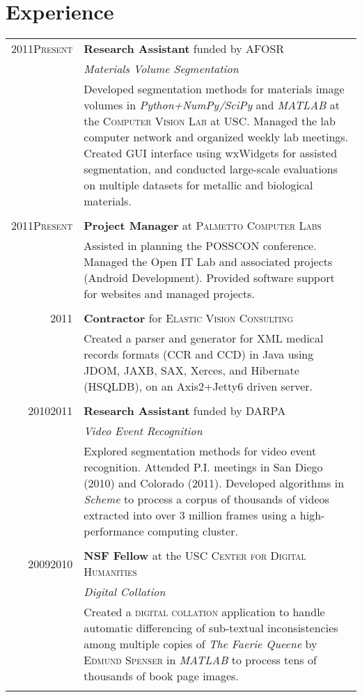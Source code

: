 \documentclass[a4paper,10pt]{article}
\begin{document}
\section{Experience}
\begin{longtable}{r|p{12cm}}
  \textsc{2011\textemdash{}Present}
  & \textbf{Research Assistant} funded by \textsc{AFOSR} \\
  &\emph{Materials Volume Segmentation}\\
  &\footnotesize{Developed segmentation methods for materials image
    volumes in \emph{Python+NumPy/SciPy} and \emph{MATLAB} at the
    \textsc{Computer Vision Lab} at \textsc{USC}. Managed the lab
    computer network and organized weekly lab meetings.  Created GUI
    interface using wxWidgets for assisted segmentation, and conducted
    large-scale evaluations on multiple datasets for metallic and
    biological materials.}
  \\\multicolumn{2}{c}{} \\
  \textsc{2011\textemdash{}Present}
  & \textbf{Project Manager} at \textsc{Palmetto Computer Labs}\\
  &\footnotesize{Assisted in planning the POSSCON conference. Managed
    the Open IT Lab and associated projects (Android
    Development). Provided software support for websites and managed
    projects.}
  \\\multicolumn{2}{c}{} \\
  \textsc{2011}
  & \textbf{Contractor} for \textsc{Elastic Vision Consulting} \\
  &\footnotesize{Created a parser and generator for XML medical
    records formats (CCR and CCD) in Java using JDOM, JAXB, SAX,
    Xerces, and Hibernate (HSQLDB), on an Axis2+Jetty6 driven server.}
  \\\multicolumn{2}{c}{} \\
  \textsc{2010\textemdash{}2011}
  & \textbf{Research Assistant} funded by \textsc{DARPA} \\
  &\emph{Video Event Recognition}\\
  &\footnotesize{Explored segmentation methods for video event
    recognition. Attended P.I. meetings in San Diego (2010) and
    Colorado (2011). Developed algorithms in \emph{Scheme} to process
    a corpus of thousands of videos extracted into over 3 million
    frames using a high-performance computing cluster.}
  \\\multicolumn{2}{c}{} \\
  \textsc{2009\textemdash{}2010}
  & \textbf{NSF Fellow} at the \textsc{USC Center for Digital Humanities} \\
  &\emph{Digital Collation}\\
  &\footnotesize{Created a \textsc{digital collation} application to
    handle automatic differencing of sub-textual inconsistencies among
    multiple copies of \emph{The Faerie Queene} by \textsc{Edmund
      Spenser} in \emph{MATLAB} to process tens of thousands of book
    page images.}
  \\\multicolumn{2}{c}{} \\
\end{longtable}
\end{document}
